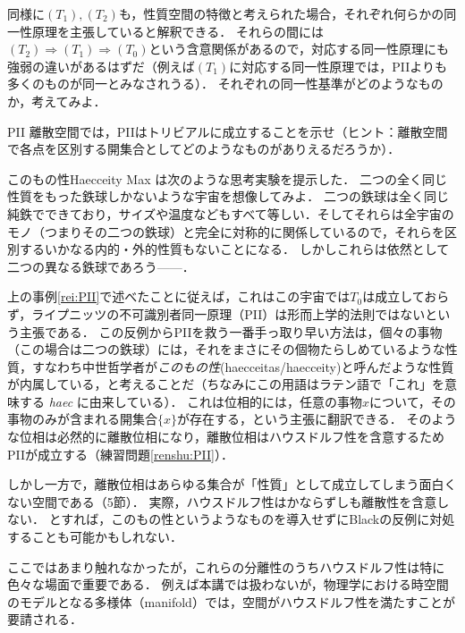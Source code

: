 \documentclass[11pt,a4paper, dvipdfmx]{jsarticle}
\begin{document}
\begin{renshu}{}{}
同様に$(T_1), (T_2)$も，性質空間の特徴と考えられた場合，それぞれ何らかの同一性原理を主張していると解釈できる．
それらの間には$(T_2) \Rightarrow (T_1) \Rightarrow (T_0)$という含意関係があるので，対応する同一性原理にも強弱の違いがあるはずだ（例えば$(T_1)$に対応する同一性原理では，PIIよりも多くのものが同一とみなされうる）．
それぞれの同一性基準がどのようなものか，考えてみよ．
\end{renshu}

\begin{renshu}{}{PII}
離散空間では，PIIはトリビアルに成立することを示せ（ヒント：離散空間で各点を区別する開集合としてどのようなものがありえるだろうか）．
\end{renshu}

\begin{rei}{このもの性}{Haecceity}
Max \cite{Black1952-dz}は次のような思考実験を提示した．
二つの全く同じ性質をもった鉄球しかないような宇宙を想像してみよ．
二つの鉄球は全く同じ純鉄でできており，サイズや温度などもすべて等しい．そしてそれらは全宇宙のモノ（つまりその二つの鉄球）と完全に対称的に関係しているので，それらを区別するいかなる内的・外的性質もないことになる．
しかしこれらは依然として二つの異なる鉄球であろう------．

上の事例\ref{rei:PII}で述べたことに従えば，これはこの宇宙では$T_0$は成立しておらず，ライプニッツの不可識別者同一原理（PII）は形而上学的法則ではないという主張である．
この反例からPIIを救う一番手っ取り早い方法は，個々の事物（この場合は二つの鉄球）には，それをまさにその個物たらしめているような性質，すなわち中世哲学者が\emph{このもの性}(haecceitas/haecceity)と呼んだような性質が内属している，と考えることだ（ちなみにこの用語はラテン語で「これ」を意味する \emph{haec} に由来している）．
これは位相的には，任意の事物$x$について，その事物のみが含まれる開集合$\{x\}$が存在する，という主張に翻訳できる．
そのような位相は必然的に離散位相になり，離散位相はハウスドルフ性を含意するためPIIが成立する（練習問題\ref{renshu:PII}）．

しかし一方で，離散位相はあらゆる集合が「性質」として成立してしまう面白くない空間である（5節）．
実際，ハウスドルフ性はかならずしも離散性を含意しない．
とすれば，このもの性というようなものを導入せずにBlackの反例に対処することも可能かもしれない．
\end{rei}

\begin{hatten}{}{}
ここではあまり触れなかったが，これらの分離性のうちハウスドルフ性は特に色々な場面で重要である．
例えば本講では扱わないが，物理学における時空間のモデルとなる多様体（manifold）では，空間がハウスドルフ性を満たすことが要請される．
\end{hatten}









\end{document}
